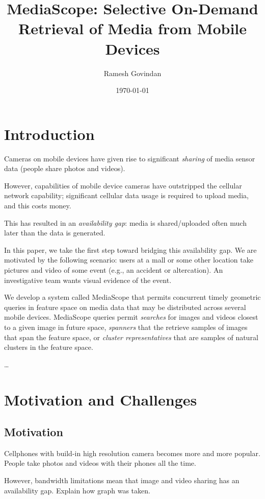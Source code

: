 \documentclass[10pt]{article}
\title{MediaScope: Selective On-Demand Retrieval of Media from Mobile Devices}
\author{Ramesh Govindan}
\date{\today}
\begin{document}
\maketitle


\section{Introduction}
\label{sec-1}


Cameras on mobile devices have given rise to significant \emph{sharing} of
media sensor data (people share photos and videos).

However, capabilities of mobile device cameras have outstripped the
cellular network capability; significant cellular data usage is
required to upload media, and this costs money.

This has resulted in an \emph{availability gap}: media is shared/uploaded
often much later than the data is generated.

In this paper, we take the first step toward bridging this
availability gap. We are motivated by the following scenario: users at
a mall or some other location take pictures and video of some event
(e.g., an accident or altercation). An investigative team wants visual
evidence of the event.

We develop a system called MediaScope that permits concurrent timely
geometric queries in feature space on media data that may be
distributed across several mobile devices. MediaScope queries permit
\emph{searches} for images and videos closest to a given image in future
space, \emph{spanners} that the retrieve samples of images that span the
feature space, or \emph{cluster representatives} that are samples of
natural clusters in the feature space.

\ldots{}
\section{Motivation and Challenges}
\label{sec-2}
\subsection{Motivation}
\label{sec-2-1}


Cellphones with build-in high resolution camera becomes more and more
popular. People take photos and videos with their phones all the time.

However, bandwidth limitations mean that image and video sharing has
an availability gap. Explain how graph was taken.
\end{document}
